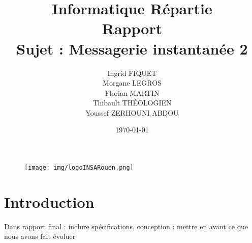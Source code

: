 \documentclass[a4paper,12pt]{article}
\title{Informatique Répartie\\Rapport\\Sujet : Messagerie instantanée 2}
\author{Ingrid FIQUET\\Morgane LEGROS\\Florian MARTIN\\Thibault THÉOLOGIEN\\Youssef ZERHOUNI ABDOU}
\date{\today}
\begin{document}
	\begin{titlepage}
		\vfill
		\begin{figure}
			\texttt{[image: img/logoINSARouen.png]}
		\end{figure}

		\maketitle

		\vfill
		\noindent \hrulefill

	\end{titlepage}



	\newpage
	\tableofcontents
	\newpage

	\section*{Introduction}

	Dans rapport final : inclure spécifications, conception : mettre en avant ce que nous avons fait évoluer
\end{document}
